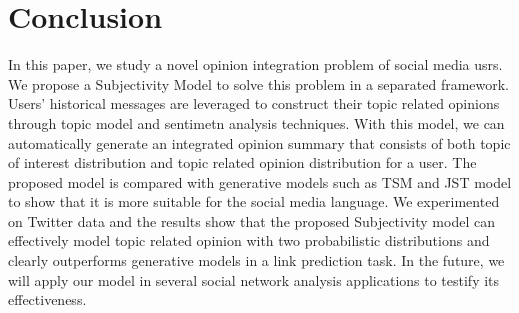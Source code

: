 \documentclass[runningheads,a4paper]{llncs}
\begin{document}
\section{Conclusion}
\label{sec6}

In this paper, we study a novel opinion integration problem of social media usrs.
We propose a Subjectivity Model to solve this problem in a separated framework. Users’ historical messages are leveraged to construct their topic related opinions through topic model and sentimetn analysis techniques. With this model, we can automatically generate an integrated opinion summary that consists of both topic of interest distribution and topic related opinion distribution for a user. The proposed model is compared with generative models such as TSM and JST model to show that it is more suitable for the social media language. We experimented on Twitter data and the results show that the proposed Subjectivity model can effectively model topic related opinion with two probabilistic distributions and clearly outperforms generative models in a link prediction task.
In the future, we will apply our model in several social network analysis applications to testify its effectiveness.



\end{document}
